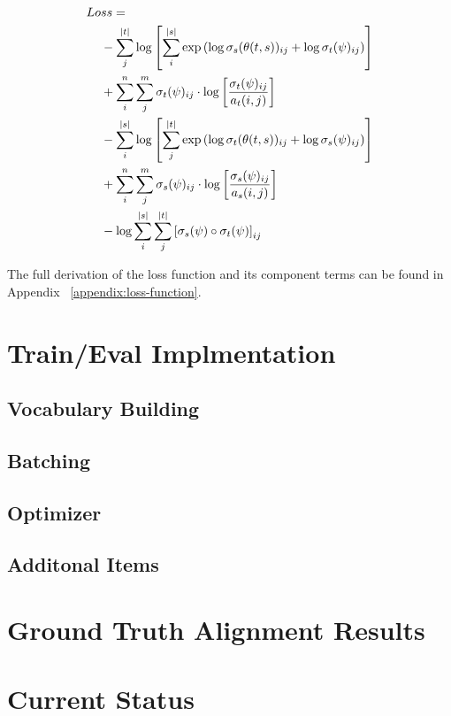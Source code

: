 \documentclass[twoside,twocolumn]{article}
\begin{document}
\begin{equation}
  \centering
\begin{split}
  Lo&ss = \\
  &- \sum_j^{|t|} \log \left[
      \sum_i^{|s|} \exp \left(
        \log \sigma_s(\theta(t, s))_{ij} + \log \sigma_t(\psi)_{ij} \right)
    \right] \\
  &+ \sum_i^n \sum_j^m \sigma_t(\psi)_{ij} \cdot \log \left[
    \frac{\sigma_t(\psi)_{ij}}{a_t(i, j)} \right] \\
  &- \sum_i^{|s|} \log \left[ \sum_j^{|t|}
      \exp \left(
        \log \sigma_t(\theta(t, s))_{ij} + \log \sigma_s(\psi)_{ij}
      \right)
    \right] \\
  &+ \sum_i^n \sum_j^m \sigma_s(\psi)_{ij} \cdot \log \left[
    \frac{\sigma_s(\psi)_{ij}}{a_s(i, j)} \right] \\
  &- \log \sum_i^{|s|} \sum_j^{|t|} \left[
    \sigma_s(\psi) \circ \sigma_t(\psi) \right]_{ij} \\
\end{split}
\end{equation}

The full derivation of the loss function and its component terms can be found in Appendix ~\ref{appendix:loss-function}.


\section{Train/Eval Implmentation}
\subsection{Vocabulary Building}
\subsection{Batching}
\subsection{Optimizer}
\subsection{Additonal Items}

\section{Ground Truth Alignment Results}

\section{Current Status}
\end{document}

